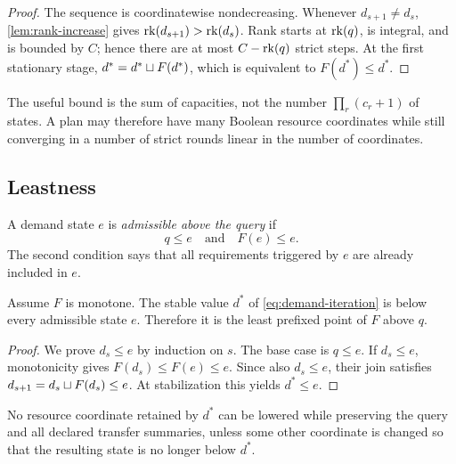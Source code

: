 \begin{proof}
The sequence is coordinatewise nondecreasing.  Whenever
\(d_{s+1}\ne d_s\), \cref{lem:rank-increase} gives
\(\operatorname{rk}(d_{s+1})>\operatorname{rk}(d_s)\).  Rank starts at \(\operatorname{rk}(q)\), is integral, and
is bounded by \(C\); hence there are at most \(C-\operatorname{rk}(q)\) strict steps.
At the first stationary stage,
\(d^*=d^*\mathbin{\sqcup} F(d^*)\), which is equivalent to \(F(d^*)\le d^*\).
\end{proof}

\begin{remark}
The useful bound is the sum of capacities, not the number
\(\prod_r(c_r+1)\) of states.  A plan may therefore have many Boolean resource
coordinates while still converging in a number of strict rounds linear in the
number of coordinates.
\end{remark}

\subsection{Leastness}

A demand state \(e\) is \emph{admissible above the query} if
\[
  q\le e
  \quad\text{and}\quad
  F(e)\le e.
\]
The second condition says that all requirements triggered by \(e\) are already
included in \(e\).

\begin{theorem}
\label{thm:demand-least}
Assume \(F\) is monotone.  The stable value \(d^*\) of
\eqref{eq:demand-iteration} is below every admissible state \(e\).  Therefore
it is the least prefixed point of \(F\) above \(q\).
\end{theorem}

\begin{proof}
We prove \(d_s\le e\) by induction on \(s\).  The base case is \(q\le e\).
If \(d_s\le e\), monotonicity gives \(F(d_s)\le F(e)\le e\).  Since also
\(d_s\le e\), their join satisfies
\(d_{s+1}=d_s\mathbin{\sqcup} F(d_s)\le e\).  At stabilization this yields
\(d^*\le e\).
\end{proof}

\begin{corollary}
\label{cor:relative-minimality}
No resource coordinate retained by \(d^*\) can be lowered while preserving the
query and all declared transfer summaries, unless some other coordinate is
changed so that the resulting state is no longer below \(d^*\).
\end{corollary}

